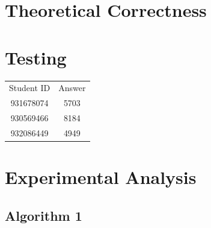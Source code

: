 \documentclass[a4paper,10pt]{article}
\begin{document}
	\section{Theoretical Correctness}

	\section{Testing}

\begin{tabular}{ | c | c | }
  \hline
  Student ID & Answer\\
  931678074 & 5703 \\
  930569466 & 8184 \\
  932086449 & 4949 \\
  \hline  
\end{tabular}
\newpage
	\section{Experimental Analysis}
		\subsection{Algorithm 1}
		
\end{document}
